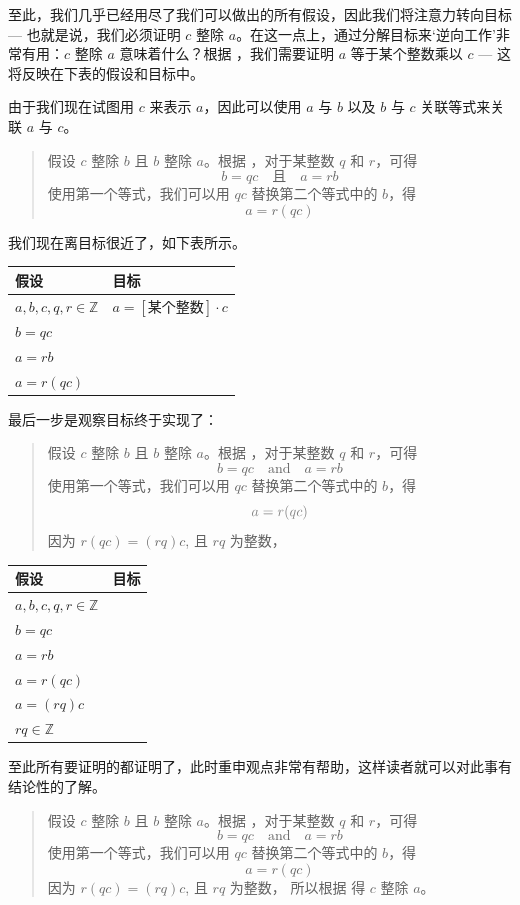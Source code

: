 \begin{example}
至此，我们几乎已经用尽了我们可以做出的所有假设，因此我们将注意力转向目标 --- 也就是说，我们必须证明 $c$ 整除 $a$。在这一点上，通过分解目标来`逆向工作'非常有用：$c$ 整除 $a$ 意味着什么？根据 ，我们需要证明 $a$ 等于某个整数乘以 $c$ --- 这将反映在下表的假设和目标中。

由于我们现在试图用 $c$ 来表示 $a$，因此可以使用 $a$ 与 $b$ 以及 $b$ 与 $c$ 关联等式来关联 $a$ 与 $c$。

\begin{quote}
{\color{gray} 假设 $c$ 整除 $b$ 且 $b$ 整除 $a$。根据 ，对于某整数 $q$ 和 $r$，可得
\[
b=qc \quad \text{且} \quad a=rb
\]
} 使用第一个等式，我们可以用 $qc$ 替换第二个等式中的 $b$，得
\[
a=r(qc)
\]
\end{quote}

我们现在离目标很近了，如下表所示。

\begin{center}
\begin{tabular}{C{150pt}|C{150pt}}
\textbf{假设} & \textbf{目标} \\ \hline
$a,b,c,q,r \in \mathbb{Z}$ & $a = [\text{某个整数}] \cdot c$ \\
$b=qc$ & \\
$a=rb$ & \\
$a=r(qc)$ & 
\end{tabular}
\end{center}

最后一步是观察目标终于实现了：

\begin{quote}
{\color{gray} 假设 $c$ 整除 $b$ 且 $b$ 整除 $a$。根据 ，对于某整数 $q$ 和 $r$，可得
\[
b=qc \quad \text{and} \quad a=rb
\]
使用第一个等式，我们可以用 $qc$ 替换第二个等式中的 $b$，得}
\[
{\color{gray} a=r(qc)}
\]
因为 $r(qc) = (rq)c$, 且 $rq$ 为整数，
\end{quote}

\begin{center}
\begin{tabular}{C{150pt}|C{150pt}}
\textbf{假设} & \textbf{目标} \\ \hline
$a,b,c,q,r \in \mathbb{Z}$ &  \\
$b=qc$ & \\
$a=rb$ & \\
$a=r(qc)$ & \\
$a=(rq)c$ & \\
$rq \in \mathbb{Z}$ & 
\end{tabular}
\end{center}

至此所有要证明的都证明了，此时重申观点非常有帮助，这样读者就可以对此事有结论性的了解。

\begin{quote}
{\color{gray} 假设 $c$ 整除 $b$ 且 $b$ 整除 $a$。根据 ，对于某整数 $q$ 和 $r$，可得
\[
b=qc \quad \text{and} \quad a=rb
\]
使用第一个等式，我们可以用 $qc$ 替换第二个等式中的 $b$，得
\[
a=r(qc)
\]
因为 $r(qc) = (rq)c$, 且 $rq$ 为整数，} 所以根据  得 $c$ 整除 $a$。
\end{quote}
\end{example}

